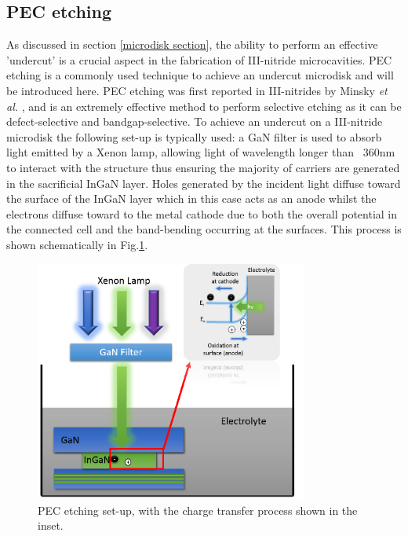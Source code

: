 \subsection{PEC etching}

\label{microdisk fab section}
As discussed in section \ref{microdisk section}, the ability to perform an effective 'undercut' is a crucial aspect in the fabrication of III-nitride microcavities. PEC etching is a commonly used technique to achieve an undercut microdisk and will be introduced here.
PEC etching was first reported in III-nitrides by Minsky \textit{et al.} \cite{Minsky1996}, and is an extremely effective method to perform selective etching as it can be defect-selective and bandgap-selective. To achieve an undercut on a III-nitride microdisk the following set-up is typically used: a GaN filter is used to absorb light emitted by a Xenon lamp, allowing light of wavelength longer than ~360nm to interact with the structure thus ensuring the majority of carriers are generated in the sacrificial InGaN layer. Holes generated by the incident light diffuse toward the surface of the InGaN layer which in this case acts as an anode whilst the electrons diffuse toward to the metal cathode due to both the overall potential in the connected cell and the band-bending occurring at the surfaces. This process is shown schematically in Fig.\ref{PECetch}.

\begin{figure}[h]
	\centering
	\includegraphics[width=0.8\textwidth]{Figs/Ch4/PEC.png}
	\caption {PEC etching set-up, with the charge transfer process shown in the inset.}
	\label{PECetch}
\end{figure}
\FloatBarrier 

